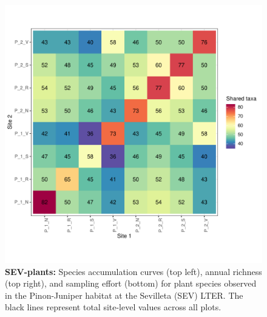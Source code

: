 \documentclass[11pt, oneside]{article}
\begin{document}
\begin{figure}[h!]
\includegraphics[scale = 0.4]{sev-plants-compagnoni_spp_shared.pdf}
\caption{{\bf SEV-plants:} Species accumulation curves (top left),  annual richness (top right), and sampling effort (bottom)  for plant species observed in the Pinon-Juniper habitat at the Sevilleta  (SEV) LTER. The black lines represent total site-level values across all plots.}
\label{sev-plants}
\end{figure}
\end{document}
